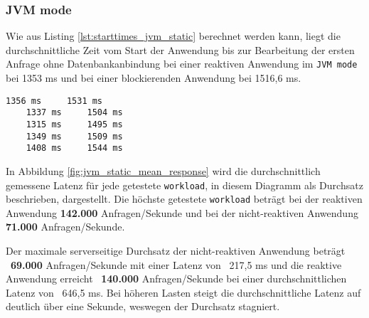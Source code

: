 \subsubsection{JVM mode}
\label{subsubsec:static_jvm_mode}
Wie aus Listing \ref{lst:starttimes_jvm_static} berechnet werden kann, liegt die durchschnittliche Zeit vom Start der Anwendung bis zur
Bearbeitung der ersten Anfrage ohne Datenbankanbindung bei einer reaktiven Anwendung im \verb|JVM mode| bei 1353 ms und bei einer
blockierenden Anwendung bei 1516,6 ms.
\begin{lstlisting}[caption=5 gemessene Startzeiten bis zur Bearbeitung der ersten Anfrage als JVM-Anwendungen: links ist die reaktive 
    Anwendung und rechts die blockierende Anwendung, captionpos=b, label=lst:starttimes_jvm_static]
    1356 ms     1531 ms
    1337 ms     1504 ms
    1315 ms     1495 ms
    1349 ms     1509 ms
    1408 ms     1544 ms
\end{lstlisting}

In Abbildung \ref{fig:jvm_static_mean_response} wird die durchschnittlich gemessene Latenz für jede getestete \verb|workload|,
in diesem Diagramm als Durchsatz beschrieben, dargestellt.
Die höchste getestete \verb|workload| beträgt bei der reaktiven Anwendung \textbf{142.000} Anfragen/Sekunde und bei der
nicht-reaktiven Anwendung \textbf{71.000} Anfragen/Sekunde.

Der maximale serverseitige Durchsatz der nicht-reaktiven Anwendung beträgt ~\textbf{69.000} Anfragen/Sekunde mit einer
Latenz von ~217,5 ms und
die reaktive Anwendung erreicht ~\textbf{140.000} Anfragen/Sekunde bei einer durchschnittlichen Latenz von ~646,5 ms.
Bei höheren Lasten steigt die durchschnittliche Latenz auf deutlich über eine Sekunde, weswegen der Durchsatz stagniert.

